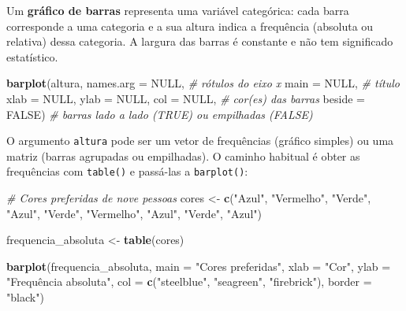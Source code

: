 \documentclass[
  portuguese,
  11pt,
  openany]{book}
\newenvironment{Shaded}{\begin{snugshade}}{\end{snugshade}}
\newcommand{\AttributeTok}[1]{\textcolor[rgb]{0.13,0.29,0.53}{#1}}
\newcommand{\CommentTok}[1]{\textcolor[rgb]{0.56,0.35,0.01}{\textit{#1}}}
\newcommand{\ConstantTok}[1]{\textcolor[rgb]{0.56,0.35,0.01}{#1}}
\newcommand{\FunctionTok}[1]{\textcolor[rgb]{0.13,0.29,0.53}{\textbf{#1}}}
\newcommand{\NormalTok}[1]{#1}
\newcommand{\OtherTok}[1]{\textcolor[rgb]{0.56,0.35,0.01}{#1}}
\newcommand{\StringTok}[1]{\textcolor[rgb]{0.31,0.60,0.02}{#1}}
\begin{document}
Um \textbf{gráfico de barras} representa uma variável categórica: cada barra corresponde a
uma categoria e a sua altura indica a frequência (absoluta ou relativa) dessa
categoria. A largura das barras é constante e não tem significado estatístico.

\begin{Shaded}
\begin{Highlighting}[]
\FunctionTok{barplot}\NormalTok{(altura,}
        \AttributeTok{names.arg =} \ConstantTok{NULL}\NormalTok{,   }\CommentTok{\# rótulos do eixo x}
        \AttributeTok{main =} \ConstantTok{NULL}\NormalTok{,        }\CommentTok{\# título}
        \AttributeTok{xlab =} \ConstantTok{NULL}\NormalTok{, }\AttributeTok{ylab =} \ConstantTok{NULL}\NormalTok{,}
        \AttributeTok{col =} \ConstantTok{NULL}\NormalTok{,         }\CommentTok{\# cor(es) das barras}
        \AttributeTok{beside =} \ConstantTok{FALSE}\NormalTok{)     }\CommentTok{\# barras lado a lado (TRUE) ou empilhadas (FALSE)}
\end{Highlighting}
\end{Shaded}

O argumento \texttt{altura} pode ser um vetor de frequências (gráfico simples) ou uma matriz
(barras agrupadas ou empilhadas). O caminho habitual é obter as frequências com
\texttt{table()} e passá-las a \texttt{barplot()}:

\begin{Shaded}
\begin{Highlighting}[]
\CommentTok{\# Cores preferidas de nove pessoas}
\NormalTok{cores }\OtherTok{\textless{}{-}} \FunctionTok{c}\NormalTok{(}\StringTok{"Azul"}\NormalTok{, }\StringTok{"Vermelho"}\NormalTok{, }\StringTok{"Verde"}\NormalTok{, }\StringTok{"Azul"}\NormalTok{, }\StringTok{"Verde"}\NormalTok{,}
           \StringTok{"Vermelho"}\NormalTok{, }\StringTok{"Azul"}\NormalTok{, }\StringTok{"Verde"}\NormalTok{, }\StringTok{"Azul"}\NormalTok{)}

\NormalTok{frequencia\_absoluta }\OtherTok{\textless{}{-}} \FunctionTok{table}\NormalTok{(cores)}

\FunctionTok{barplot}\NormalTok{(frequencia\_absoluta,}
        \AttributeTok{main =} \StringTok{"Cores preferidas"}\NormalTok{,}
        \AttributeTok{xlab =} \StringTok{"Cor"}\NormalTok{,}
        \AttributeTok{ylab =} \StringTok{"Frequência absoluta"}\NormalTok{,}
        \AttributeTok{col =} \FunctionTok{c}\NormalTok{(}\StringTok{"steelblue"}\NormalTok{, }\StringTok{"seagreen"}\NormalTok{, }\StringTok{"firebrick"}\NormalTok{),}
        \AttributeTok{border =} \StringTok{"black"}\NormalTok{)}
\end{Highlighting}
\end{Shaded}
\end{document}
